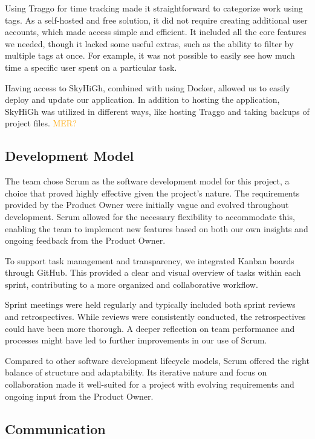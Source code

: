Using Traggo for time tracking made it straightforward to categorize work using tags. As a self-hosted and free solution, it did not require creating additional user accounts, which made access simple and efficient. It included all the core features we needed, though it lacked some useful extras, such as the ability to filter by multiple tags at once. For example, it was not possible to easily see how much time a specific user spent on a particular task.

Having access to SkyHiGh, combined with using Docker, allowed us to easily deploy and update our application. In addition to hosting the application, SkyHiGh was utilized in different ways, like hosting Traggo and taking backups of project files. \textcolor{orange}{MER?}

\subsection{Development Model}

The team chose Scrum as the software development model for this project, a choice that proved highly effective given the project's nature. The requirements provided by the \gls{Product Owner} were initially vague and evolved throughout development. Scrum allowed for the necessary flexibility to accommodate this, enabling the team to implement new features based on both our own insights and ongoing feedback from the \gls{Product Owner}.

To support task management and transparency, we integrated Kanban boards through GitHub. This provided a clear and visual overview of tasks within each sprint, contributing to a more organized and collaborative workflow.

Sprint meetings were held regularly and typically included both sprint reviews and retrospectives. While reviews were consistently conducted, the retrospectives could have been more thorough. A deeper reflection on team performance and processes might have led to further improvements in our use of Scrum.

Compared to other software development lifecycle models, Scrum offered the right balance of structure and adaptability. Its iterative nature and focus on collaboration made it well-suited for a project with evolving requirements and ongoing input from the \gls{Product Owner}.

\subsection{Communication}

